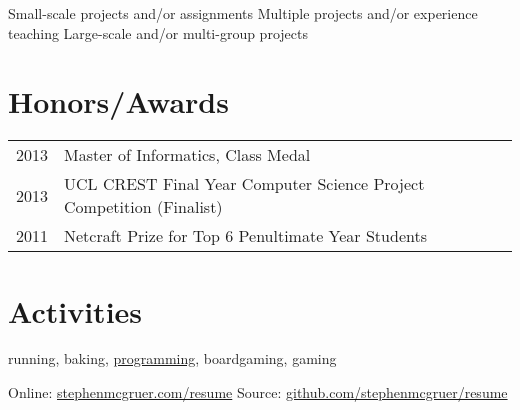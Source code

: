 \documentclass[10pt]{article}
\begin{document}
\begin{multicols}{4}
\raggedcolumns

\begin{itemize}

\renewcommand{\labelitemi}{}

\renewcommand{\skill}{\textnormal}

\setlength{\itemsep}{1pt}
\setlength{\parskip}{0pt}
\setlength{\parsep}{0pt}

\skills{\asthree}{\oneskill}
\skills{\bash}{\twoskill}
\skills{\ccpp}{\twoskill}
\skills{\git}{\twoskill}
\skills{\html}{\oneskill}
\skills{\java}{\threeskill}
\skills{\js}{\oneskill}
\skills{\LaTeX}{\twoskill}
\skills{\matlab}{\oneskill}
\skills{\python}{\twoskill}
\skills{\ruby}{\oneskill}
\skills{\svn}{\oneskill}
\skills{\scala}{\oneskill}

\end{itemize}

\end{multicols}
\vspace{-1em}
  \begin{footnotesize}
    \oneskill Small-scale projects and/or assignments \hfill 
    \twoskill Multiple projects and/or experience teaching \hfill
    \threeskill Large-scale and/or multi-group projects
  \end{footnotesize}


\vspace{0.75em}
\section{Honors/Awards}
\begin{tabularx}{\textwidth}{r|X}
2013 & Master of Informatics, Class Medal \\
2013 & UCL CREST Final Year Computer Science Project Competition (Finalist) \\
2011 & Netcraft Prize for Top 6 Penultimate Year Students \\
\end{tabularx}


\vspace{0.75em}
\section{Activities}
running, baking, \href{https://github.com/stephenmcgruer}{programming}, boardgaming, gaming


\null\vfill
\footnotesize{
  Online:  \href{http://www.stephenmcgruer.com/resume}{stephenmcgruer.com/resume} \hfill
  Source:  \href{https://github.com/stephenmcgruer/resume}{github.com/stephenmcgruer/resume}
}
\end{document}

